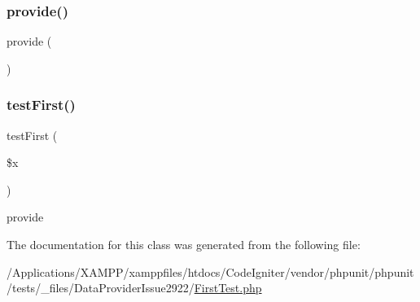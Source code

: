 \subsubsection{\texorpdfstring{provide()}{provide()}}
{\footnotesize\ttfamily provide (\begin{DoxyParamCaption}{ }\end{DoxyParamCaption})}

\mbox{\label{class_foo_1_1_data_provider_issue2922_1_1_first_test_af8ab67a72789da589982c3966d8642ef}} 
\subsubsection{\texorpdfstring{test\+First()}{testFirst()}}
{\footnotesize\ttfamily test\+First (\begin{DoxyParamCaption}\item[{}]{\$x }\end{DoxyParamCaption})}

provide 

The documentation for this class was generated from the following file\+:\begin{DoxyCompactItemize}
\item 
/\+Applications/\+X\+A\+M\+P\+P/xamppfiles/htdocs/\+Code\+Igniter/vendor/phpunit/phpunit/tests/\+\_\+files/\+Data\+Provider\+Issue2922/\mbox{\hyperlink{_data_provider_issue2922_2_first_test_8php}{First\+Test.\+php}}\end{DoxyCompactItemize}
